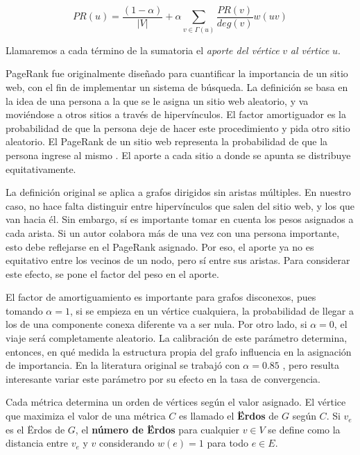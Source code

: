 \documentclass[journal]{IEEEtran}
\begin{document}
\begin{equation} \label{eq:pagerank}
	PR(u) = \frac{(1-\alpha)}{|V|} + \alpha \sum_{v \in \Gamma(u)} \frac{PR(v)}{deg(v)} w(uv)
\end{equation}

Llamaremos a cada término de la sumatoria el \textit{aporte del vértice} \(v\) \textit{al vértice} \(u\).

PageRank fue originalmente diseñado para cuantificar la importancia de un sitio web, con el fin de implementar un sistema de búsqueda. La definición se basa en la idea de una persona a la que se le asigna un sitio web aleatorio, y va moviéndose a otros sitios a través de hipervínculos. El factor amortiguador es la probabilidad de que la persona deje de hacer este procedimiento y pida otro sitio aleatorio. El PageRank de un sitio web representa la probabilidad de que la persona ingrese al mismo \cite{google}. El aporte a cada sitio a donde se apunta se distribuye equitativamente.

La definición original se aplica a grafos dirigidos sin aristas múltiples. En nuestro caso, no hace falta distinguir entre hipervínculos que salen del sitio web, y los que van hacia él. Sin embargo, sí es importante tomar en cuenta los pesos asignados a cada arista. Si un autor colabora más de una vez con una persona importante, esto debe reflejarse en el PageRank asignado. Por eso, el aporte ya no es equitativo entre los vecinos de un nodo, pero sí entre sus aristas. Para considerar este efecto, se pone el factor del peso en el aporte.

El factor de amortiguamiento es importante para grafos disconexos, pues tomando \(\alpha = 1\), si se empieza en un vértice cualquiera, la probabilidad de llegar a los de una componente conexa diferente va a ser nula. Por otro lado, si \(\alpha = 0\), el viaje será completamente aleatorio. La calibración de este parámetro determina, entonces, en qué medida la estructura propia del grafo influencia en la asignación de importancia. En la literatura original se trabajó con \(\alpha = 0.85\) \cite{google}, pero resulta interesante variar este parámetro por su efecto en la tasa de convergencia\cite{stanford}.

Cada métrica determina un orden de vértices según el valor asignado. El vértice que maximiza el valor de una métrica \(C\) es llamado el \textbf{Ërdos} de \(G\) según \(C\). Si \(v_e\) es el Ërdos de \(G\), el \textbf{número de Ërdos} para cualquier \(v \in V\) se define como la distancia entre \(v_e\) y \(v\) considerando \(w(e) = 1\) para todo \(e \in E\).
\end{document}
